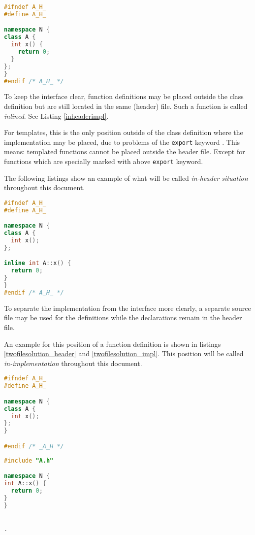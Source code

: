 \begin{lstlisting}[caption={In-class implementation in A.h},
label={classheaderimpl}, language=C++ ]
#ifndef A_H_
#define A_H_

namespace N {
class A {
  int x() {
    return 0;
  }
};
}
#endif /* A_H_ */
\end{lstlisting}

To keep the interface clear, function definitions may be placed outside the
class definition but are still located in the same (header) file. Such a
function is called \textit{inlined}. See Listing \ref{inheaderimpl}.\newline

For templates, this is the only position outside of the class definition where
the implementation may be placed, due to problems of the \texttt{export} keyword
\cite{ext03}. This means: templated functions cannot be placed outside the
header file. Except for functions which are specially marked with above
\texttt{export} keyword.

The following listings show an example of what will be
called \textit{in-header situation} throughout this document.

\begin{lstlisting}[caption={In-header implementation in A.h},
label={inheaderimpl}, language=C++ ]
#ifndef A_H_
#define A_H_

namespace N {
class A {
  int x();
};

inline int A::x() {
  return 0;
}
}
#endif /* A_H_ */
\end{lstlisting}

To separate the implementation from the interface more clearly, a separate
source file may be used for the definitions while the declarations remain in the
header file.

An example for this position of a function definition is shown in
listings \ref{twofilesolution_header} and \ref{twofilesolution_impl}. This
position will be called \textit{in-implementation} throughout this document.

\vspace{0.5cm}
\begin{minipage}{.48\textwidth}
\lstset{xrightmargin=0.5cm}
\begin{lstlisting}[caption={A.h},label={twofilesolution_header},language=C++]
#ifndef A_H_
#define A_H_

namespace N {
class A {
  int x();
};
}

#endif /* _A_H */
\end{lstlisting}
\end{minipage}%
\begin{minipage}{.48\textwidth}
\lstset{xleftmargin=0.5cm}
\begin{lstlisting}[caption={A.cpp},label={twofilesolution_impl},language=C++]
#include "A.h"

namespace N {
int A::x() { 
  return 0;
}
}


.
\end{lstlisting}
\end{minipage}

